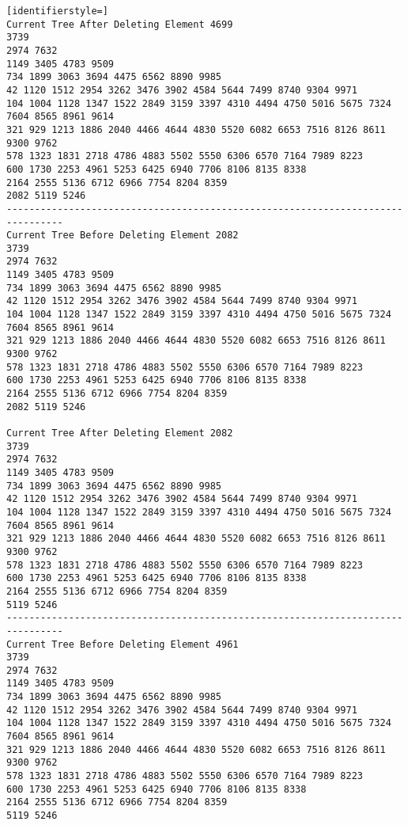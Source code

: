 \documentclass[12pt]{scrartcl}
\begin{document}
\begin{lstlisting}[identifierstyle=]
Current Tree After Deleting Element 4699
3739
2974 7632
1149 3405 4783 9509
734 1899 3063 3694 4475 6562 8890 9985
42 1120 1512 2954 3262 3476 3902 4584 5644 7499 8740 9304 9971
104 1004 1128 1347 1522 2849 3159 3397 4310 4494 4750 5016 5675 7324 7604 8565 8961 9614
321 929 1213 1886 2040 4466 4644 4830 5520 6082 6653 7516 8126 8611 9300 9762
578 1323 1831 2718 4786 4883 5502 5550 6306 6570 7164 7989 8223
600 1730 2253 4961 5253 6425 6940 7706 8106 8135 8338
2164 2555 5136 6712 6966 7754 8204 8359
2082 5119 5246
--------------------------------------------------------------------------------
Current Tree Before Deleting Element 2082
3739
2974 7632
1149 3405 4783 9509
734 1899 3063 3694 4475 6562 8890 9985
42 1120 1512 2954 3262 3476 3902 4584 5644 7499 8740 9304 9971
104 1004 1128 1347 1522 2849 3159 3397 4310 4494 4750 5016 5675 7324 7604 8565 8961 9614
321 929 1213 1886 2040 4466 4644 4830 5520 6082 6653 7516 8126 8611 9300 9762
578 1323 1831 2718 4786 4883 5502 5550 6306 6570 7164 7989 8223
600 1730 2253 4961 5253 6425 6940 7706 8106 8135 8338
2164 2555 5136 6712 6966 7754 8204 8359
2082 5119 5246

Current Tree After Deleting Element 2082
3739
2974 7632
1149 3405 4783 9509
734 1899 3063 3694 4475 6562 8890 9985
42 1120 1512 2954 3262 3476 3902 4584 5644 7499 8740 9304 9971
104 1004 1128 1347 1522 2849 3159 3397 4310 4494 4750 5016 5675 7324 7604 8565 8961 9614
321 929 1213 1886 2040 4466 4644 4830 5520 6082 6653 7516 8126 8611 9300 9762
578 1323 1831 2718 4786 4883 5502 5550 6306 6570 7164 7989 8223
600 1730 2253 4961 5253 6425 6940 7706 8106 8135 8338
2164 2555 5136 6712 6966 7754 8204 8359
5119 5246
--------------------------------------------------------------------------------
Current Tree Before Deleting Element 4961
3739
2974 7632
1149 3405 4783 9509
734 1899 3063 3694 4475 6562 8890 9985
42 1120 1512 2954 3262 3476 3902 4584 5644 7499 8740 9304 9971
104 1004 1128 1347 1522 2849 3159 3397 4310 4494 4750 5016 5675 7324 7604 8565 8961 9614
321 929 1213 1886 2040 4466 4644 4830 5520 6082 6653 7516 8126 8611 9300 9762
578 1323 1831 2718 4786 4883 5502 5550 6306 6570 7164 7989 8223
600 1730 2253 4961 5253 6425 6940 7706 8106 8135 8338
2164 2555 5136 6712 6966 7754 8204 8359
5119 5246


\end{lstlisting}
\end{document}
